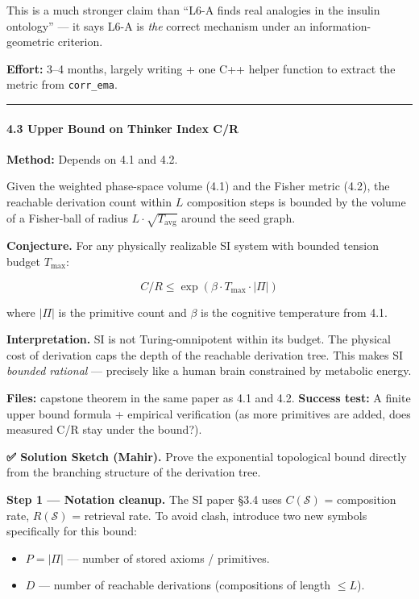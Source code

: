 \documentclass[
  11pt,
  a4paper,
]{article}
\providecommand{\tightlist}{%
  \setlength{\itemsep}{0pt}\setlength{\parskip}{0pt}}
\begin{document}
This is a much stronger claim than ``L6-A finds real analogies in the
insulin ontology'' --- it says L6-A is \emph{the} correct mechanism
under an information-geometric criterion.

\textbf{Effort:} 3--4 months, largely writing + one C++ helper function
to extract the metric from \texttt{corr\_ema}.

\begin{center}\rule{0.5\linewidth}{0.5pt}\end{center}

\paragraph{4.3 Upper Bound on Thinker Index
C/R}\label{upper-bound-on-thinker-index-cr}

\textbf{Method:} Depends on 4.1 and 4.2.

Given the weighted phase-space volume (4.1) and the Fisher metric (4.2),
the reachable derivation count within \(L\) composition steps is bounded
by the volume of a Fisher-ball of radius \(L \cdot \sqrt{T_\text{avg}}\)
around the seed graph.

\textbf{Conjecture.} For any physically realizable SI system with
bounded tension budget \(T_\text{max}\):

\[
C/R \leq \exp(\beta \cdot T_\text{max} \cdot |\Pi|)
\]

where \(|\Pi|\) is the primitive count and \(\beta\) is the cognitive
temperature from 4.1.

\textbf{Interpretation.} SI is not Turing-omnipotent within its budget.
The physical cost of derivation caps the depth of the reachable
derivation tree. This makes SI \emph{bounded rational} --- precisely
like a human brain constrained by metabolic energy.

\textbf{Files:} capstone theorem in the same paper as 4.1 and 4.2.
\textbf{Success test:} A finite upper bound formula + empirical
verification (as more primitives are added, does measured C/R stay under
the bound?).

\textbf{✅ Solution Sketch (Mahir).} Prove the exponential topological
bound directly from the branching structure of the derivation tree.

\textbf{Step 1 --- Notation cleanup.} The SI paper §3.4 uses
\(C(\mathcal{S})\) = composition rate, \(R(\mathcal{S})\) = retrieval
rate. To avoid clash, introduce two new symbols specifically for this
bound:

\begin{itemize}
\tightlist
\item
  \(P = |\Pi|\) --- number of stored axioms / primitives.
\item
  \(D\) --- number of reachable derivations (compositions of length
  \(\leq L\)).
\end{itemize}
\end{document}
